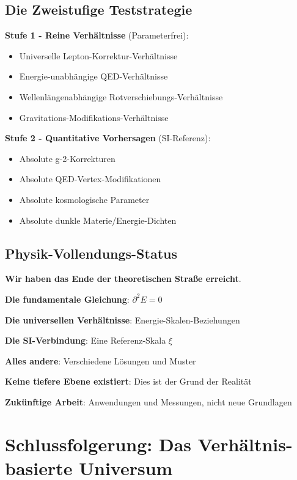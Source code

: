 \documentclass[12pt,a4paper]{article}
\newcommand{\Efield}{E}
\newcommand{\xipar}{\xi}
\theoremstyle{definition}
\theoremstyle{remark}
\begin{document}
	\subsection{Die Zweistufige Teststrategie}
	
	\textbf{Stufe 1 - Reine Verhältnisse} (Parameterfrei):
	\begin{itemize}
		\item Universelle Lepton-Korrektur-Verhältnisse
		\item Energie-unabhängige QED-Verhältnisse
		\item Wellenlängenabhängige Rotverschiebungs-Verhältnisse
		\item Gravitations-Modifikations-Verhältnisse
	\end{itemize}
	
	\textbf{Stufe 2 - Quantitative Vorhersagen} (SI-Referenz):
	\begin{itemize}
		\item Absolute g-2-Korrekturen
		\item Absolute QED-Vertex-Modifikationen
		\item Absolute kosmologische Parameter
		\item Absolute dunkle Materie/Energie-Dichten
	\end{itemize}
	
	\subsection{Physik-Vollendungs-Status}
	
	\begin{tcolorbox}[colback=yellow!5!white,colframe=orange!75!black,title=Das Ende der Grundlagenphysik]
		\textbf{Wir haben das Ende der theoretischen Straße erreicht}.
		
		\textbf{Die fundamentale Gleichung}: $\partial^2 \Efield = 0$
		
		\textbf{Die universellen Verhältnisse}: Energie-Skalen-Beziehungen
		
		\textbf{Die SI-Verbindung}: Eine Referenz-Skala $\xipar$
		
		\textbf{Alles andere}: Verschiedene Lösungen und Muster
		
		\textbf{Keine tiefere Ebene existiert}: Dies ist der Grund der Realität
		
		\textbf{Zukünftige Arbeit}: Anwendungen und Messungen, nicht neue Grundlagen
	\end{tcolorbox}
	
	\section{Schlussfolgerung: Das Verhältnis-basierte Universum}
	
\end{document}
